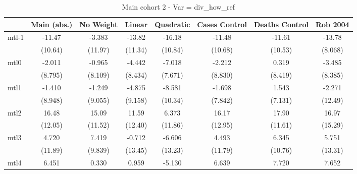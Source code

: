\documentclass{article}
\begin{document}
{
\def\sym#1{\ifmmode^{#1}\else\(^{#1}\)\fi}
\begin{longtable}{l*{7}{c}}
\caption{Main cohort 2 - Var = div\_how\_ref}\\
\hline\hline\endfirsthead\hline\endhead\hline\endfoot\endlastfoot
                &\multicolumn{1}{c}{Main (abs.)}&\multicolumn{1}{c}{No Weight}&\multicolumn{1}{c}{Linear}&\multicolumn{1}{c}{Quadratic}&\multicolumn{1}{c}{Cases Control}&\multicolumn{1}{c}{Deaths Control}&\multicolumn{1}{c}{Rob 2004}\\
\hline
mtl-1           &   -11.47         &   -3.383         &   -13.82         &   -16.18         &   -11.48         &   -11.61         &   -13.78         \\
                &  (10.64)         &  (11.97)         &  (11.34)         &  (10.84)         &  (10.68)         &  (10.53)         &  (8.068)         \\
mtl0            &   -2.011         &   -0.965         &   -4.442         &   -7.018         &   -2.212         &    0.319         &   -3.485         \\
                &  (8.795)         &  (8.109)         &  (8.434)         &  (7.671)         &  (8.830)         &  (8.419)         &  (8.385)         \\
mtl1            &   -1.410         &   -1.249         &   -4.875         &   -8.581         &   -1.698         &    1.543         &   -2.271         \\
                &  (8.948)         &  (9.055)         &  (9.158)         &  (10.34)         &  (7.842)         &  (7.131)         &  (12.49)         \\
mtl2            &    16.48         &    15.09         &    11.59         &    6.373         &    16.17         &    17.90         &    16.97         \\
                &  (12.05)         &  (11.52)         &  (12.40)         &  (11.86)         &  (12.95)         &  (11.61)         &  (15.29)         \\
mtl3            &    4.720         &    7.419         &   -0.712         &   -6.606         &    4.493         &    6.345         &    5.751         \\
                &  (11.89)         &  (9.839)         &  (13.45)         &  (13.23)         &  (11.79)         &  (10.76)         &  (13.31)         \\
mtl4            &    6.451         &    0.330         &    0.959         &   -5.130         &    6.639         &    7.720         &    7.652         \\

\end{longtable}}
\end{document}
